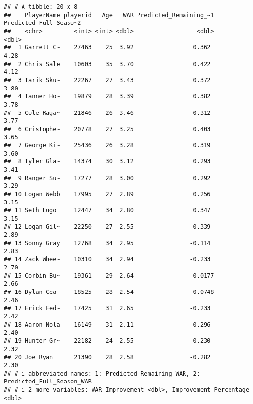 \documentclass[
]{article}
\begin{document}
\begin{verbatim}
## # A tibble: 20 x 8
##    PlayerName playerid   Age   WAR Predicted_Remaining_~1 Predicted_Full_Seaso~2
##    <chr>         <int> <int> <dbl>                  <dbl>                  <dbl>
##  1 Garrett C~    27463    25  3.92                 0.362                    4.28
##  2 Chris Sale    10603    35  3.70                 0.422                    4.12
##  3 Tarik Sku~    22267    27  3.43                 0.372                    3.80
##  4 Tanner Ho~    19879    28  3.39                 0.382                    3.78
##  5 Cole Raga~    21846    26  3.46                 0.312                    3.77
##  6 Cristophe~    20778    27  3.25                 0.403                    3.65
##  7 George Ki~    25436    26  3.28                 0.319                    3.60
##  8 Tyler Gla~    14374    30  3.12                 0.293                    3.41
##  9 Ranger Su~    17277    28  3.00                 0.292                    3.29
## 10 Logan Webb    17995    27  2.89                 0.256                    3.15
## 11 Seth Lugo     12447    34  2.80                 0.347                    3.15
## 12 Logan Gil~    22250    27  2.55                 0.339                    2.89
## 13 Sonny Gray    12768    34  2.95                -0.114                    2.83
## 14 Zack Whee~    10310    34  2.94                -0.233                    2.70
## 15 Corbin Bu~    19361    29  2.64                 0.0177                   2.66
## 16 Dylan Cea~    18525    28  2.54                -0.0748                   2.46
## 17 Erick Fed~    17425    31  2.65                -0.233                    2.42
## 18 Aaron Nola    16149    31  2.11                 0.296                    2.40
## 19 Hunter Gr~    22182    24  2.55                -0.230                    2.32
## 20 Joe Ryan      21390    28  2.58                -0.282                    2.30
## # i abbreviated names: 1: Predicted_Remaining_WAR, 2: Predicted_Full_Season_WAR
## # i 2 more variables: WAR_Improvement <dbl>, Improvement_Percentage <dbl>
\end{verbatim}
\end{document}
